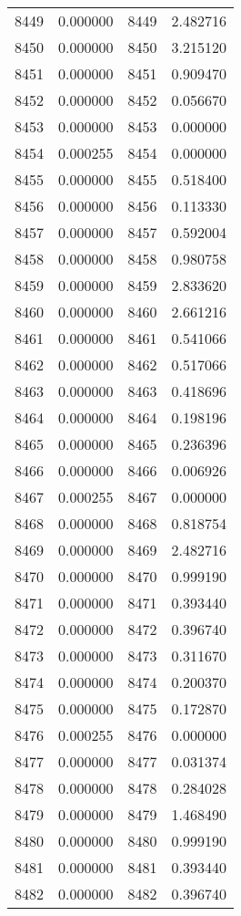 \documentclass[12pt]{article}
\begin{document}
\begin{longtable}{@{}cccc@{}}
8449 & 0.000000 & 8449 & 2.482716 \\
8450 & 0.000000 & 8450 & 3.215120 \\
8451 & 0.000000 & 8451 & 0.909470 \\
8452 & 0.000000 & 8452 & 0.056670 \\
8453 & 0.000000 & 8453 & 0.000000 \\
8454 & 0.000255 & 8454 & 0.000000 \\
8455 & 0.000000 & 8455 & 0.518400 \\
8456 & 0.000000 & 8456 & 0.113330 \\
8457 & 0.000000 & 8457 & 0.592004 \\
8458 & 0.000000 & 8458 & 0.980758 \\
8459 & 0.000000 & 8459 & 2.833620 \\
8460 & 0.000000 & 8460 & 2.661216 \\
8461 & 0.000000 & 8461 & 0.541066 \\
8462 & 0.000000 & 8462 & 0.517066 \\
8463 & 0.000000 & 8463 & 0.418696 \\
8464 & 0.000000 & 8464 & 0.198196 \\
8465 & 0.000000 & 8465 & 0.236396 \\
8466 & 0.000000 & 8466 & 0.006926 \\
8467 & 0.000255 & 8467 & 0.000000 \\
8468 & 0.000000 & 8468 & 0.818754 \\
8469 & 0.000000 & 8469 & 2.482716 \\
8470 & 0.000000 & 8470 & 0.999190 \\
8471 & 0.000000 & 8471 & 0.393440 \\
8472 & 0.000000 & 8472 & 0.396740 \\
8473 & 0.000000 & 8473 & 0.311670 \\
8474 & 0.000000 & 8474 & 0.200370 \\
8475 & 0.000000 & 8475 & 0.172870 \\
8476 & 0.000255 & 8476 & 0.000000 \\
8477 & 0.000000 & 8477 & 0.031374 \\
8478 & 0.000000 & 8478 & 0.284028 \\
8479 & 0.000000 & 8479 & 1.468490 \\
8480 & 0.000000 & 8480 & 0.999190 \\
8481 & 0.000000 & 8481 & 0.393440 \\
8482 & 0.000000 & 8482 & 0.396740 \\

\end{longtable}
\end{document}
